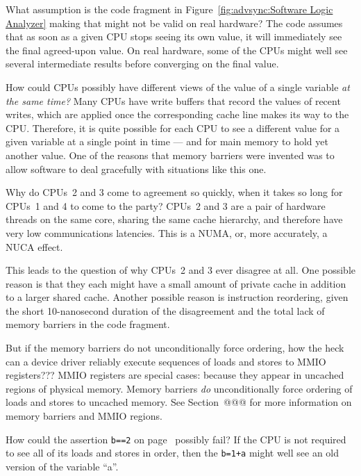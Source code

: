\QuickQ{}
	What assumption is the code fragment
	in Figure~\ref{fig:advsync:Software Logic Analyzer}
	making that might not be valid on real hardware?
\QuickA{}
	The code assumes that as soon as a given CPU stops
	seeing its own value, it will immediately see the
	final agreed-upon value.
	On real hardware, some of the CPUs might well see several
	intermediate results before converging on the final value.

\QuickQ{}
	How could CPUs possibly have different views of the
	value of a single variable \emph{at the same time?}
\QuickA{}
	Many CPUs have write buffers that record the values of
	recent writes, which are applied once the corresponding
	cache line makes its way to the CPU.
	Therefore, it is quite possible for each CPU to see a
	different value for a given variable at a single point
	in time --- and for main memory to hold yet another value.
	One of the reasons that memory barriers were invented was
	to allow software to deal gracefully with situations like
	this one.

\QuickQ{}
	Why do CPUs~2 and 3 come to agreement so quickly, when it
	takes so long for CPUs~1 and 4 to come to the party?
\QuickA{}
	CPUs~2 and 3 are a pair of hardware threads on the same
	core, sharing the same cache hierarchy, and therefore have
	very low communications latencies.
	This is a NUMA, or, more accurately, a NUCA effect.

	This leads to the question of why CPUs~2 and 3 ever disagree
	at all.
	One possible reason is that they each might have a small amount
	of private cache in addition to a larger shared cache.
	Another possible reason is instruction reordering, given the
	short 10-nanosecond duration of the disagreement and the
	total lack of memory barriers in the code fragment.

\QuickQ{}
	But if the memory barriers do not unconditionally force
	ordering, how the heck can a device driver reliably execute
	sequences of loads and stores to MMIO registers???
\QuickA{}
	MMIO registers are special cases: because they appear
	in uncached regions of physical memory.
	Memory barriers \emph{do} unconditionally force ordering
	of loads and stores to uncached memory.
	See Section~@@@ for more information on memory barriers
	and MMIO regions.

\QuickQ{}
	How could the assertion {\tt b==2} on
	page~\pageref{codesample:advsync:What Can You Count On? 1}
	possibly fail?
\QuickA{}
	If the CPU is not required to see all of its loads and
	stores in order, then the {\tt b=1+a} might well see an
	old version of the variable ``a''.
	
